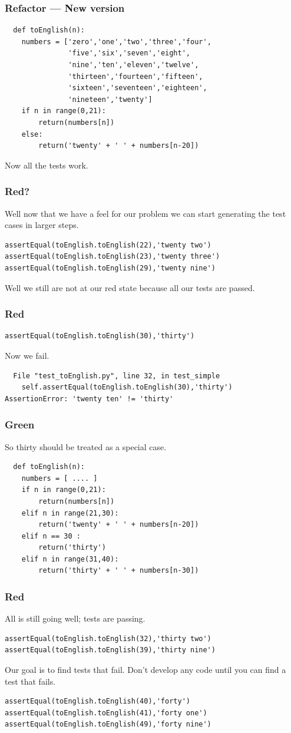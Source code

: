 \documentclass{beamer}
\begin{document}
\begin{frame}[fragile]
\frametitle{Refactor --- New version}
\begin{lstlisting}
  def toEnglish(n):
    numbers = ['zero','one','two','three','four',
               'five','six','seven','eight',
               'nine','ten','eleven','twelve',
               'thirteen','fourteen','fifteen',
               'sixteen','seventeen','eighteen',
               'nineteen','twenty']
    if n in range(0,21):
        return(numbers[n])
    else:
        return('twenty' + ' ' + numbers[n-20])
\end{lstlisting}
  Now all the tests work.
\end{frame}
\begin{frame}[fragile]
\frametitle{Red?}
Well now that we have a feel for our problem we can start generating
the test cases in larger steps.
\begin{lstlisting}
assertEqual(toEnglish.toEnglish(22),'twenty two')
assertEqual(toEnglish.toEnglish(23),'twenty three')
assertEqual(toEnglish.toEnglish(29),'twenty nine')
\end{lstlisting}
Well we still are not at our red state because all our tests are
passed.
\end{frame}
\begin{frame}[fragile]
\frametitle{Red}
\begin{lstlisting}
assertEqual(toEnglish.toEnglish(30),'thirty')
\end{lstlisting}
Now we fail.
\begin{verbatim}
  File "test_toEnglish.py", line 32, in test_simple
    self.assertEqual(toEnglish.toEnglish(30),'thirty')
AssertionError: 'twenty ten' != 'thirty'
\end{verbatim}  
\end{frame}
\begin{frame}[fragile]
  \frametitle{Green}
So thirty should be treated as a special case.
\begin{lstlisting}
  def toEnglish(n):
    numbers = [ .... ]
    if n in range(0,21):
        return(numbers[n])
    elif n in range(21,30):
        return('twenty' + ' ' + numbers[n-20])
    elif n == 30 :
        return('thirty')
    elif n in range(31,40):
        return('thirty' + ' ' + numbers[n-30])
\end{lstlisting}
\end{frame}
\begin{frame}[fragile]
\frametitle{Red}
All is still going well; tests are passing. 
\begin{lstlisting}
assertEqual(toEnglish.toEnglish(32),'thirty two')
assertEqual(toEnglish.toEnglish(39),'thirty nine')
\end{lstlisting}
Our goal is to find tests that fail. Don't develop any code until you
can find a test that fails.
\begin{lstlisting}
assertEqual(toEnglish.toEnglish(40),'forty')
assertEqual(toEnglish.toEnglish(41),'forty one')
assertEqual(toEnglish.toEnglish(49),'forty nine')
\end{lstlisting}
\end{frame}
\end{document}
